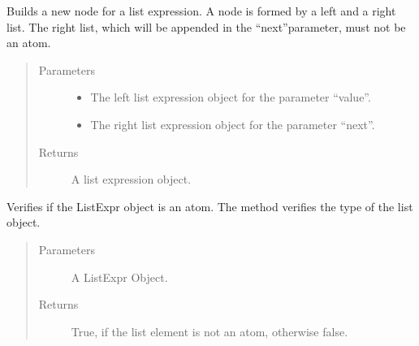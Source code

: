 \documentclass[letterpaper,10pt,english]{sphinxmanual}
\begin{document}
\begin{fulllineitems}
\label{\detokenize{index:secondodb.api.support.secondolistexpr.build_new_list_node}}
Builds a new node for a list expression. A node is formed by a left and a right list. The right list, which will be
appended in the “next”\sphinxhyphen{}parameter, must not be an atom.
\begin{quote}\begin{description}
\item[{Parameters}] \leavevmode\begin{itemize}
\item {} 
 \textendash{} The left list expression object for the parameter “value”.

\item {} 
 \textendash{} The right list expression object for the parameter “next”.

\end{itemize}

\item[{Returns}] \leavevmode
A list expression object.

\end{description}\end{quote}

\end{fulllineitems}


\begin{fulllineitems}
\label{\detokenize{index:secondodb.api.support.secondolistexpr.check_if_atom}}
Verifies if the ListExpr object is an atom. The method verifies the type of the list object.
\begin{quote}\begin{description}
\item[{Parameters}] \leavevmode
{} \textendash{} A ListExpr Object.

\item[{Returns}] \leavevmode
True, if the list element is not an atom, otherwise false.

\end{description}\end{quote}

\end{fulllineitems}
\end{document}
